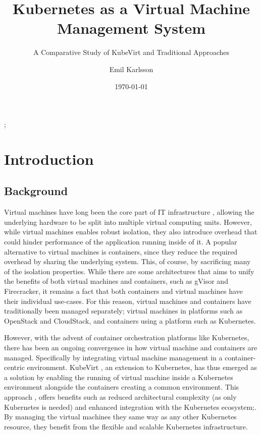 \documentclass{kththesis}
\title{Kubernetes as a Virtual Machine Management System}
\subtitle{A Comparative Study of KubeVirt and Traditional Approaches}
\author{Emil Karlsson}
\date{\today}
\begin{document}
\frontmatter

\titlepage%

\begin{abstract}
  
\end{abstract}


\begin{otherlanguage}{swedish}
  \begin{abstract}
  \end{abstract}
\end{otherlanguage}


\tableofcontents


\mainmatter;


\chapter{Introduction}


\section{Background}
Virtual machines have long been the core part of IT infrastructure \cite{Li2023}, allowing the underlying hardware to be split into multiple virtual computing units. However, while virtual machines enables robust isolation, they also introduce overhead that could hinder performance of the application running inside of it. A popular alternative to virtual machines is containers, since they reduce the required overhead by sharing the underlying system. This, of course, by sacrificing many of the isolation properties. While there are some architectures that aims to unify the benefits of both virtual machines and containers, such as gVisor and Firecracker, it remains a fact that both containers and virtual machines have their individual use-cases. For this reason, virtual machines and containers have traditionally been managed separately; virtual machines in platforms such as OpenStack and CloudStack, and containers using a platform such as Kubernetes. 

However, with the advent of container orchestration platforms like Kubernetes, there has been an ongoing convergence \cite{Li2023} in how virtual machine and containers are managed. Specifically by integrating virtual machine management in a container-centric environment. KubeVirt \cite{kubevirt}, an extension to Kubernetes, has thus emerged as a solution by enabling the running of virtual machine inside a Kubernetes environment alongside the containers creating a common environment. This approach \cite{kubevirt-cncf}, offers benefits such as reduced architectural complexity (as only Kubernetes is needed) and enhanced integration with the Kubernetes ecosystem;. By managing the virtual machines they same way as any other Kubernetes resource, they benefit from the flexible and scalable Kubernetes infrastructure. 
\end{document}
